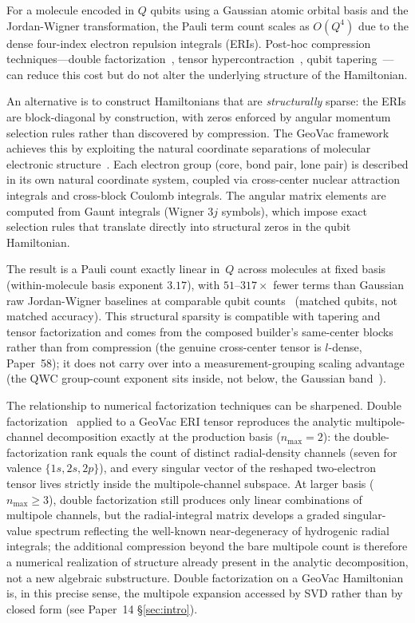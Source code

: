 \documentclass[twocolumn,pra,amsmath,amssymb,superscriptaddress]{revtex4-2}
\begin{document}
For a molecule encoded in $Q$ qubits using a Gaussian atomic orbital basis
and the Jordan-Wigner transformation, the Pauli term count scales as
$O(Q^4)$ due to the dense four-index electron repulsion integrals (ERIs).
Post-hoc compression techniques---double factorization~\cite{vonBurg2021},
tensor hypercontraction~\cite{Lee2021}, qubit tapering~\cite{Bravyi2017}---can
reduce this cost but do not alter the underlying structure of the Hamiltonian.

An alternative is to construct Hamiltonians that are \emph{structurally}
sparse: the ERIs are block-diagonal by construction, with zeros enforced
by angular momentum selection rules rather than discovered by compression.
The GeoVac framework achieves this by exploiting the natural coordinate
separations of molecular electronic structure~\cite{GeoVac_Paper7,
GeoVac_Paper14,GeoVac_Paper17,GeoVac_Paper19}. Each electron group
(core, bond pair, lone pair) is described in its own natural coordinate
system, coupled via cross-center nuclear attraction integrals and
cross-block Coulomb integrals.  The angular matrix elements are computed
from Gaunt integrals (Wigner 3$j$ symbols), which impose exact selection
rules that translate directly into structural zeros in the qubit Hamiltonian.

The result is a Pauli count exactly linear in~$Q$ across molecules at
fixed basis (within-molecule basis exponent $3.17$), with
$51$--$317\times$ fewer terms than Gaussian raw
Jordan-Wigner baselines at comparable qubit counts~\cite{GeoVac_Paper14}
(matched qubits, not matched accuracy).
This structural sparsity is compatible with tapering and tensor
factorization and comes from the composed builder's same-center blocks
rather than from compression (the genuine cross-center tensor is $l$-dense,
Paper~58);
it does not carry over into a measurement-grouping scaling advantage
(the QWC group-count exponent sits inside, not below, the Gaussian
band~\cite{GeoVac_Paper14}).

The relationship to numerical factorization techniques can be sharpened.
Double factorization~\cite{vonBurg2021} applied to a GeoVac ERI tensor
reproduces the analytic multipole-channel decomposition exactly at the
production basis ($n_{\max} = 2$): the double-factorization rank equals
the count of distinct radial-density channels (seven for valence
$\{1s, 2s, 2p\}$), and every singular vector of the reshaped two-electron
tensor lives strictly inside the multipole-channel subspace.  At larger
basis ($n_{\max} \geq 3$), double factorization still produces only
linear combinations of multipole channels, but the radial-integral matrix
develops a graded singular-value spectrum reflecting the well-known
near-degeneracy of hydrogenic radial integrals; the additional
compression beyond the bare multipole count is therefore a numerical
realization of structure already present in the analytic decomposition,
not a new algebraic substructure.  Double factorization on a GeoVac
Hamiltonian is, in this precise sense, the multipole expansion accessed
by SVD rather than by closed form (see Paper~14 \S\ref{sec:intro}).
\end{document}
